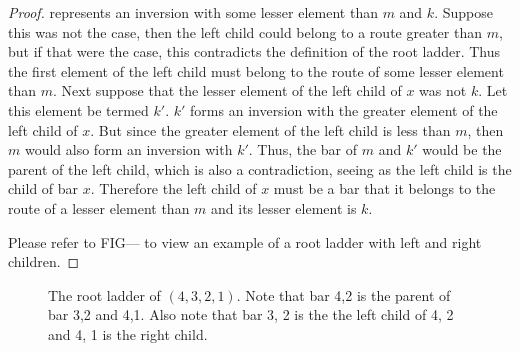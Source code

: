 \begin{proof}
    represents an inversion with some lesser element than $m$ and $k$. Suppose this was not the case, 
    then the left child could belong to a route greater than $m$, but if that were the case, this contradicts 
    the definition of the root ladder.
    Thus the first element of the left child must belong to the route of some lesser element than $m$. Next suppose that 
    the lesser element of the left child of $x$ was not $k$. Let this element be termed $k'$.
    $k'$ forms an inversion with the greater element of the left child of $x$. But since the greater element of the left child is less than $m$, 
    then $m$ would also form an inversion with $k'$. Thus, the bar of $m$ and $k'$ would be the parent of the left child, which is also 
    a contradiction, seeing as the left child is the child of bar $x$. Therefore the left child of $x$ must be a bar that 
    it belongs to the route of a lesser element than $m$ and its lesser element is $k$.\par 
    Please refer to FIG--- to view an example of a root ladder with left and right children.\pagebreak

    
\end{proof}


\begin{figure}[!htp]
    \begin{center}
    \end{center}
    \caption{The root ladder of $(4,3,2,1)$. Note that bar 4,2 is the parent of bar 3,2 and 4,1. Also note that 
    bar 3, 2 is the the left child of 4, 2 and 4, 1 is the right child.}
\end{figure}


